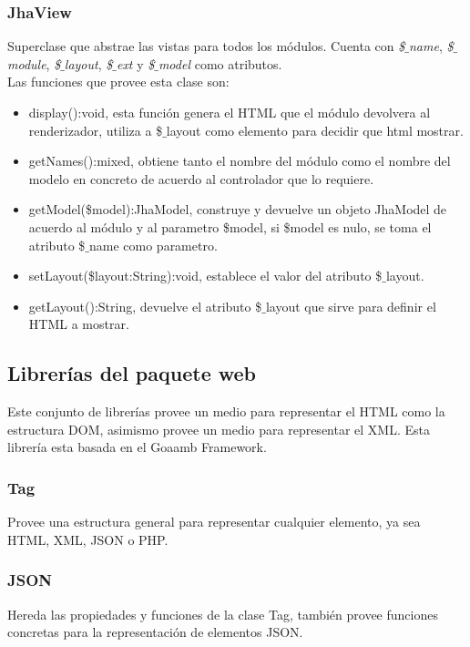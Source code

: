 \subsubsection{JhaView}
Superclase que abstrae las vistas para todos los m\'odulos. Cuenta con \textit{\$$\_$name}, \textit{\$$\_$module}, \textit{\$$\_$layout}, \textit{\$$\_$ext} y \textit{\$$\_$model} como atributos.\\
Las funciones que provee esta clase son:
\begin{itemize}
\item \textsf{display():void}, esta funci\'on genera el HTML que el m\'odulo devolvera al renderizador, utiliza a \$$\_$layout como elemento para decidir que html mostrar.
\item \textsf{getNames():mixed}, obtiene tanto el nombre del m\'odulo como el nombre del modelo en concreto de acuerdo al controlador que lo requiere.
\item \textsf{getModel(\$model):JhaModel}, construye y devuelve un objeto JhaModel de acuerdo al m\'odulo y al parametro \$model, si \$model es nulo, se toma el atributo \$$\_$name como parametro.
\item \textsf{setLayout(\$layout:String):void}, establece el valor del atributo \$$\_$layout.
\item \textsf{getLayout():String}, devuelve el atributo \$$\_$layout que sirve para definir el HTML a mostrar.
\end{itemize}

\subsection{Librer\'ias del paquete \textsf{web}}
Este conjunto de librer\'ias provee un medio para representar el HTML como la estructura DOM, asimismo provee un medio para representar el XML. Esta librer\'ia esta basada en el Goaamb Framework.

\subsubsection{Tag}
Provee una estructura general para representar cualquier elemento, ya sea HTML, XML, JSON o PHP.

\subsubsection{JSON}
Hereda las propiedades y funciones de la clase Tag, tambi\'en provee funciones concretas para la representaci\'on de elementos JSON.


